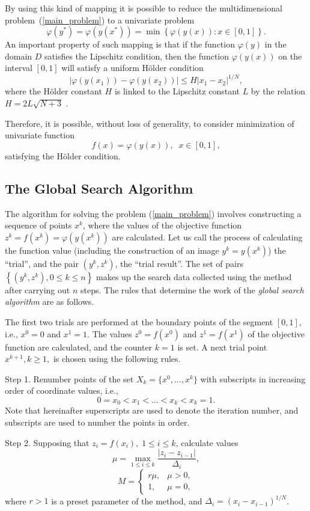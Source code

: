 \documentclass[applsci,article,submit,moreauthors,pdftex]{Definitions/mdpi}
\begin{document}
By using this kind of mapping it is possible to reduce the multidimensional problem~(\ref{main_problem}) to a univariate problem
\[
\varphi(y^\ast)=\varphi(y(x^\ast))=\min{\left\{\varphi(y(x)): x\in[0,1]\right\}}.
\]
An important property of such mapping is that if the function $\varphi(y)$ in the domain $D$ satisfies the Lipschitz condition, then the function $\varphi(y(x))$ on the interval $[0,1]$ will satisfy a uniform H{\"o}lder condition
\[
\left|\varphi(y(x_1))-\varphi(y(x_2))\right|\leq H\left|x_1-x_2\right|^{1/N},
\]
where the H{\"o}lder constant $H$ is linked to the Lipschitz constant $L$ by the relation $H=2L\sqrt{N+3}$ \cite{Strongin2000}.

Therefore, it is possible, without loss of generality, to consider minimization of univariate function
\[
f(x)=\varphi(y(x)), \;\; x\in[0,1],
\]
satisfying the H{\"o}lder condition.


\subsection{The Global Search Algorithm}\label{GSA}

The algorithm for solving the problem (\ref{main_problem}) involves constructing a sequence of points $x^k$, where the values of the objective function $z^k = f(x^k)=\varphi(y(x^k))$ are calculated. Let us call the process of calculating the function value (including the construction of an image $y^k=y(x^k)$) the ``trial'', and the pair $(y^k, z^k)$, the ``trial result''. The set of pairs $\left\{(y^k, z^k), 0\leq k\leq n\right\}$ makes up the search data collected using the method after carrying out $n$ steps. The rules that determine the work of the \textit{global search algorithm} are as follows.

The first two trials are performed at the boundary points of the segment $[0,1]$, i.e., $x^0 = 0$ and $x^1 = 1$. The values $z^0 = f(x^0)$ and $z^1 = f(x^1)$ of the objective function are calculated, and the counter $k = 1$ is set. A next trial point $x^{k+1}, k \geq 1,$ is chosen using the following rules.

Step 1. Renumber points of the set $X_k=\{x^0,\dots,x^k\} $ with subscripts in increasing order of coordinate values, i.e.,
\[
0=x_0<x_1<\dots <x_k<x_{k}=1.
\]
Note that hereinafter superscripts are used to denote the iteration number, and subscripts are used to number the points in order.

Step 2. Supposing that  $z_i=f(x_i), \; 1\leq i \leq k$, calculate values 
\begin{equation}\label{mu}
\mu = \max_{1\leq i \leq k}\frac{\left|z_i-z_{i-1}\right|}{\Delta_i},
\end{equation}
\[
M = \left\{
   \begin{array}{lr}
     r\mu, & \mu > 0,\\
     1, & \mu = 0,
   \end{array}
\right.
 \]
where $r>1$ is a preset parameter of the method, and $\Delta_i=\left(x_i-x_{i-1}\right)^{1/N}$.
\end{document}
